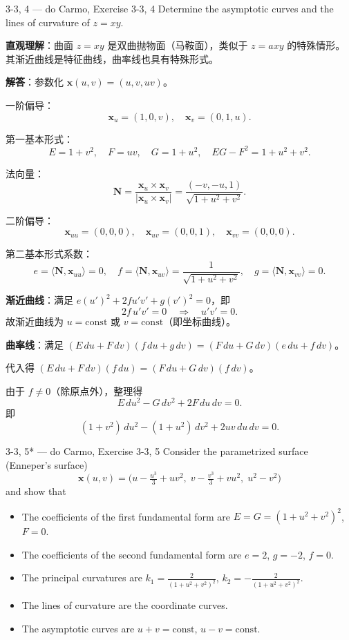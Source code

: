 \begin{exercise}{3-3, 4 — do Carmo, Exercise 3-3, 4}
Determine the asymptotic curves and the lines of curvature of $z = xy$.
\end{exercise}

\begin{solution}
\textbf{直观理解}：曲面 $z = xy$ 是双曲抛物面（马鞍面），类似于 $z = axy$ 的特殊情形。其渐近曲线是特征曲线，曲率线也具有特殊形式。

\textbf{解答}：参数化 $\mathbf{x}(u,v) = (u, v, uv)$。

一阶偏导：
\[
\mathbf{x}_u = (1, 0, v),\quad \mathbf{x}_v = (0, 1, u).
\]

第一基本形式：
\[
E = 1 + v^2,\quad F = uv,\quad G = 1 + u^2,\quad EG - F^2 = 1 + u^2 + v^2.
\]

法向量：
\[
\mathbf{N} = \frac{\mathbf{x}_u \times \mathbf{x}_v}{|\mathbf{x}_u \times \mathbf{x}_v|} = \frac{(-v, -u, 1)}{\sqrt{1+u^2+v^2}}.
\]

二阶偏导：
\[
\mathbf{x}_{uu} = (0, 0, 0),\quad \mathbf{x}_{uv} = (0, 0, 1),\quad \mathbf{x}_{vv} = (0, 0, 0).
\]

第二基本形式系数：
\[
e = \langle \mathbf{N}, \mathbf{x}_{uu} \rangle = 0,\quad
f = \langle \mathbf{N}, \mathbf{x}_{uv} \rangle = \frac{1}{\sqrt{1+u^2+v^2}},\quad
g = \langle \mathbf{N}, \mathbf{x}_{vv} \rangle = 0.
\]

\textbf{渐近曲线}：满足 $e(u')^2 + 2fu'v' + g(v')^2 = 0$，即
\[
2f\,u'v' = 0 \quad \Longrightarrow \quad u'v' = 0.
\]
故渐近曲线为 $u = \mathrm{const}$ 或 $v = \mathrm{const}$（即坐标曲线）。

\textbf{曲率线}：满足 $(E\,du + F\,dv)(f\,du + g\,dv) = (F\,du + G\,dv)(e\,du + f\,dv)$。

代入得 $(E\,du + F\,dv)(f\,du) = (F\,du + G\,dv)(f\,dv)$。

由于 $f \neq 0$（除原点外），整理得
\[
E\,du^2 - G\,dv^2 + 2F\,du\,dv = 0.
\]
即
\[
(1+v^2)\,du^2 - (1+u^2)\,dv^2 + 2uv\,du\,dv = 0.
\]
\end{solution}

\begin{exercise}{3-3, 5* — do Carmo, Exercise 3-3, 5}
Consider the parametrized surface (Enneper's surface)
\[
\mathbf{x}(u, v) = \bigl(u - \tfrac{u^3}{3} + uv^2,\; v - \tfrac{v^3}{3} + vu^2,\; u^2 - v^2\bigr)
\]
and show that
\begin{itemize}
\item[a.] The coefficients of the first fundamental form are $E = G = (1 + u ^ {2} + v ^ {2}) ^ {2}$, $F = 0$.
\item[b.] The coefficients of the second fundamental form are $e = 2$, $g = -2$, $f = 0$.
\item[c.] The principal curvatures are $k _ {1} = \frac {2}{\left(1 + u ^ {2} + v ^ {2}\right) ^ {2}}$, $k _ {2} = - \frac {2}{\left(1 + u ^ {2} + v ^ {2}\right) ^ {2}}$.
\item[d.] The lines of curvature are the coordinate curves.
\item[e.] The asymptotic curves are $u + v = \mathrm{const}$, $u - v = \mathrm{const}$.
\end{itemize}
\end{exercise}

